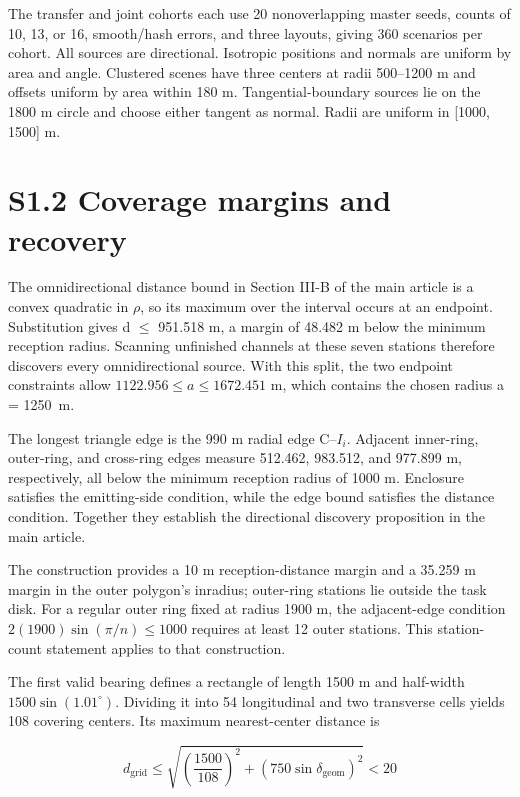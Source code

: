 \documentclass[11pt,letterpaper]{article}
\begin{document}
The transfer and joint cohorts each use 20 nonoverlapping master seeds, counts of 10, 13, or 16, smooth/hash errors, and three layouts, giving 360 scenarios per cohort. All sources are directional. Isotropic positions and normals are uniform by area and angle. Clustered scenes have three centers at radii 500--1200 m and offsets uniform by area within 180 m. Tangential-boundary sources lie on the 1800 m circle and choose either tangent as normal. Radii are uniform in [1000, 1500] m.

\section*{S1.2 Coverage margins and recovery}

The omnidirectional distance bound in Section III-B of the main article is a convex quadratic in \ensuremath{\rho}, so its maximum over the interval occurs at an endpoint. Substitution gives d \ensuremath{\le} 951.518 m, a margin of 48.482 m below the minimum reception radius. Scanning unfinished channels at these seven stations therefore discovers every omnidirectional source. With this split, the two endpoint constraints allow $1122.956\le a\le 1672.451$ m, which contains the chosen radius a = 1250~m.

The longest triangle edge is the 990 m radial edge C--$I_i$. Adjacent inner-ring, outer-ring, and cross-ring edges measure 512.462, 983.512, and 977.899 m, respectively, all below the minimum reception radius of 1000 m. Enclosure satisfies the emitting-side condition, while the edge bound satisfies the distance condition. Together they establish the directional discovery proposition in the main article.

The construction provides a 10 m reception-distance margin and a 35.259 m margin in the outer polygon's inradius; outer-ring stations lie outside the task disk. For a regular outer ring fixed at radius 1900 m, the adjacent-edge condition $2(1900)\sin(\pi/n)\le 1000$ requires at least 12 outer stations. This station-count statement applies to that construction.

The first valid bearing defines a rectangle of length 1500 m and half-width $1500\sin(1.01^\circ)$. Dividing it into 54 longitudinal and two transverse cells yields 108 covering centers. Its maximum nearest-center distance is

\begin{equation}\label{eq:s1}
d_{\mathrm{grid}}\le\sqrt{\left(\frac{1500}{108}\right)^2+\left(750\sin\delta_{\mathrm{geom}}\right)^2}<20
\end{equation}
\end{document}
